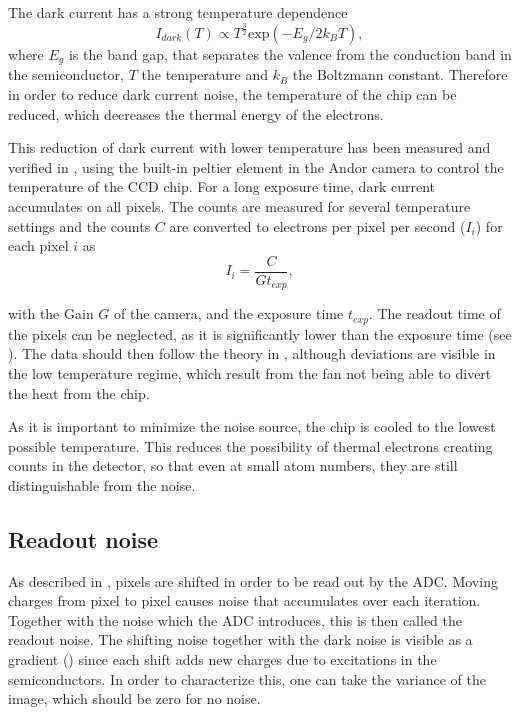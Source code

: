 The dark current has a strong temperature dependence\cite{Ottenstein2006}
\begin{equation}
\label{eq:darkcurrent}
I_{dark}(T) \propto T^{\frac{3}{2}} \mathrm{exp}(-E_g/2k_BT),
\end{equation}
where $E_g$ is the band gap, that separates the valence from the conduction band in the semiconductor, $T$ the temperature and $k_B$ the Boltzmann constant.
Therefore in order to reduce dark current noise, the temperature of the chip can be reduced, which decreases the thermal energy of the electrons.

This reduction of dark current with lower temperature has been measured and verified in , using the built-in peltier element in the Andor camera to control the temperature of the CCD chip. For a long exposure time, dark current accumulates on all pixels. The counts are measured for several temperature settings and the counts $C$ are converted to electrons per pixel per second ($I_i$)\cite{Ottenstein2006} for each pixel $i$ as
\begin{equation}
I_{i} = \frac{C}{G t_{exp}},
\end{equation}


with the Gain $G$ of the camera, and the exposure time $t_{exp}$. The readout time of the pixels can be neglected, as it is significantly lower than the exposure time (see ).
The data should then follow the theory in , although deviations are visible in the low temperature regime, which result from the fan not being able to divert the heat from the chip.

As it is important to minimize the noise source, the chip is cooled to the lowest possible temperature. This reduces the possibility of thermal electrons creating counts in the detector, so that even at small atom numbers, they are still distinguishable from the noise.

\subsection{Readout noise}
As described in , pixels are shifted in order to be read out by the ADC. Moving charges from pixel to pixel causes noise that accumulates over each iteration. Together with the noise which the ADC introduces, this is then called the readout noise. The shifting noise together with the dark noise is visible as a gradient () since each shift adds new charges due to excitations in the semiconductors. In order to characterize this, one can take the variance of the image, which should be zero for no noise.

